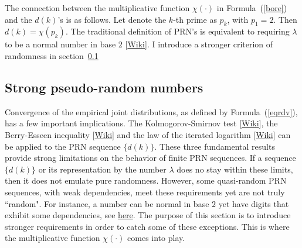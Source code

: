 \documentclass[oneside,10pt]{book}
\begin{document}
The connection between the multiplicative function $\chi(\cdot)$ in Formula~(\ref{bore}) and the $d(k)$'s is as follows. Let denote the $k$-th prime as $p_k$, with $p_1=2$. Then $d(k)=\chi(p_k)$. The traditional definition of PRN's is equivalent to requiring $\lambda$ to
be a \textcolor{index}{normal number} in base $2$ [\href{https://en.wikipedia.org/wiki/Normal_number}{Wiki}]. I introduce a stronger
 criterion of randomness in section~\ref{sprng}


\subsection{Strong pseudo-random numbers}\label{sprng}

Convergence of the empirical joint distributions, as defined by Formula~(\ref{eqrdv}), has a few important implications. 
The \textcolor{index}{Kolmogorov-Smirnov test} [\href{https://en.wikipedia.org/wiki/Kolmogorov\%E2\%80\%93Smirnov_test}{Wiki}], the \textcolor{index}{Berry-Esseen inequality} [\href{https://en.wikipedia.org/wiki/Berry\%E2\%80\%93Esseen_theorem}{Wiki}] 
and the \textcolor{index}{law of the iterated logarithm} [\href{https://en.wikipedia.org/wiki/Law_of_the_iterated_logarithm}{Wiki}] can be applied to the PRN sequence $\{d(k)\}$. These three fundamental results provide strong limitations on the behavior of finite PRN 
 sequences. If a sequence $\{d(k)\}$ or its representation by the number $\lambda$ does no stay within these limits, 
  then it does not emulate pure randomness.  However, some quasi-random PRN sequences, with weak dependencies, meet these requirements yet are not truly ``random". For instance, a number can be normal in base $2$ yet have digits that exhibit some dependencies, 
 see \href{https://mathoverflow.net/questions/426815/normal-numbers-and-law-of-the-iterated-logarithm}{here}.  The purpose of this section is to introduce stronger requirements in order to catch some of these exceptions. This is where the multiplicative function $\chi(\cdot)$ comes into play. 
\end{document}

